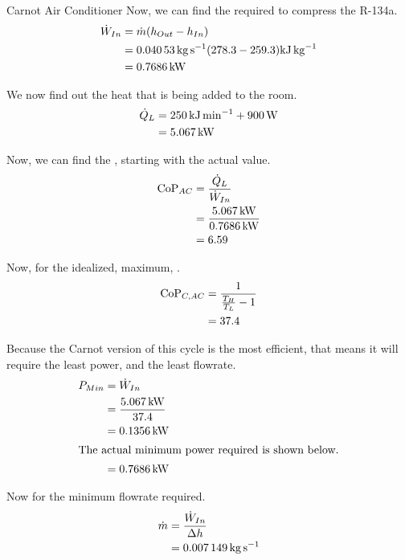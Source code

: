 \begin{example}{Carnot Air Conditioner}
  Now, we can find the  required to compress the R-134a.
  \begin{align*}
    \dot{W}_{In} &= \dot{m} (h_{Out}- h_{In}) \\
                          &= \SI{0.04053}{\kilo\gram\per\second} (278.3 - 259.3) \si{\kilo\joule\per\kilo\gram} \\
    &= \SI{0.7686}{\kilo\watt}
  \end{align*}

  We now find out the heat that is being added to the room.
  \begin{align*}
    \dot{Q}_{L} &= \SI{250}{\kilo\joule\per\minute} + \SI{900}{\watt} \\
                         &= \SI{5.067}{\kilo\watt}
  \end{align*}

  Now, we can find the , starting with the actual value.
  \begin{align*}
    \text{CoP}_{AC} &= \frac{\dot{Q}_{L}}{\dot{W}_{In}} \\
              &= \frac{\SI{5.067}{\kilo\watt}}{\SI{0.7686}{\kilo\watt}} \\
    &= 6.59
  \end{align*}

  Now, for the idealized, maximum, .
  \begin{align*}
    \text{CoP}_{C, AC} &= \frac{1}{\frac{T_{H}}{T_{L}} - 1} \\
                 &= 37.4
  \end{align*}

  Because the Carnot version of this cycle is the most efficient, that means it will require the least power, and the least flowrate.
  \begin{align*}
    P_{Min} &= \dot{W}_{In} \\
                 &= \frac{\SI{5.067}{\kilo\watt}}{37.4} \\
                 &= \SI{0.1356}{\kilo\watt} \\
    \intertext{The actual minimum power required is shown below.}
                 &= \SI{0.7686}{\kilo\watt}
  \end{align*}

  Now for the minimum flowrate required.
  \begin{align*}
    \dot{m} &= \frac{\dot{W}_{In}}{\Delta h} \\
                     &= \SI{0.007149}{\kilo\gram\per\second}
  \end{align*}


\end{example}
